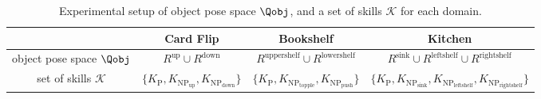 \begin{table*}[ht]
\vspace{-5mm}
\centering
\renewcommand{\arraystretch}{1.5} %
\begin{adjustbox}{width=1.7\columnwidth}
\begin{tabular}{|c|c|c|c|}
\hline
  & \textbf{Card Flip} & \textbf{Bookshelf} & \textbf{Kitchen} \\
\hline
object pose space $\Qobj$ & $R^\text{up} \cup R^\text{down}$ & $R^\text{uppershelf} \cup R^\text{lowershelf}$ &  $ R^\text{sink} \cup R^\text{leftshelf} \cup R^\text{rightshelf}$ \\
\hline
set of skills $\mathcal{K}$ & $\{K_\text{P}, K_{\text{NP}_{\text{up}}}, K_{\text{NP}_{\text{down}}}\}$ & $\{K_\text{P}, K_{\text{NP}_{\text{topple}}}, K_{\text{NP}_{\text{push}}}\}$ & $\{K_\text{P}, K_{\text{NP}_\text{sink}}, K_{\text{NP}_\text{leftshelf}},  K_{\text{NP}_\text{rightshelf}}\}$ \\
\hline
\end{tabular}
\end{adjustbox}
\begin{flushleft}
\footnotesize
\caption{Experimental setup of object pose space $\Qobj$, and a set of skills $\mathcal{K}$ for each domain.}\label{table:exp_setup}
\end{flushleft}
\vspace{-6mm}
\end{table*}
